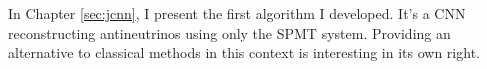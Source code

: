 \documentclass[../main.tex]{subfiles}
\begin{document}
%
%
%
%
%

In Chapter \ref{sec:jcnn}, I present the first algorithm I developed. It's a CNN reconstructing antineutrinos using only the SPMT system. Providing an alternative to classical methods in this context is interesting in its own right.
\end{document}
